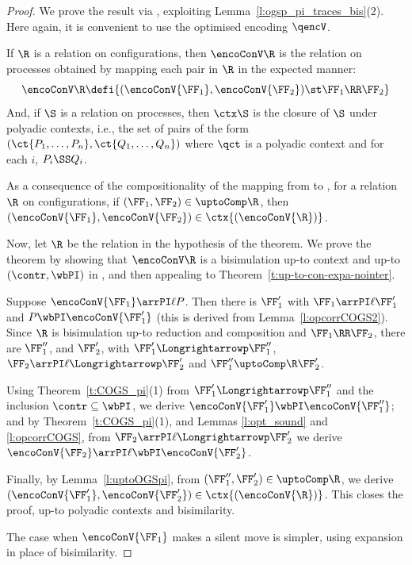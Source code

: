 \begin{proof}
We prove the result via \piI, exploiting Lemma~\ref{l:ogsp_pi_traces_bis}(2).
Here again, it is convenient to use
the optimised encoding $\qencV$.

If $\R$ is a relation on \COGS configurations, then 
$\encoConV \R$ is the relation on \piI processes obtained by mapping each pair
in $\R$ in the expected manner: 
\[ \encoConV \R \defi \{ (\encoConV {\FF_1}, \encoConV {\FF_2}) \st \FF_1 \RR \FF_2 
 \} \] 
And, if $\S$ is a relation on \piI processes, then $\ctx \S$ is the closure of $\S$ under
polyadic contexts, i.e., the set of pairs  of the form  
$(\ct {P_1,\ldots, P_n},\ct {Q_1,\ldots, Q_n})$ where $\qct$ is a polyadic context and for
each $i$, $P_i \SS Q_i$. 

As a consequence of the compositionality of the mapping from
\COGS to \piI,
for  a relation   $\R$ on \COGS configurations, 
if ${(\FF_1, \FF_2)} \in  { \uptoComp \R}$, then 
$( \encoConV {\FF_1},  \encoConV {\FF_2}) \in  \ctx{( \encoConV{ \R })}$. 




Now, let $\R$ be the relation in the hypothesis of the theorem.
We  prove the theorem by  showing that 
$\encoConV \R$ is a bisimulation
 up-to context and up-to $(\contr,
 \wbPI)$ in 
\piI, and then appealing to Theorem~\ref{t:up-to-con-expa-nointer}.  

Suppose 
$\encoConV {\FF_1}  \arrPI \ell P$.  Then
there is $\FF_1'$ with  
$\FF_1  \arrPI \ell \FF_1' $ and $P  \wbPI \encoConV {\FF'_1}$ (this is derived from
Lemma~\ref{l:opcorrCOGS2}).  
Since $\R$ is bisimulation up-to
 reduction and  composition and $\FF_1 \RR \FF_2$, there are 
  $\FF_1''$, and $\FF_2'$, with  
$\FF'_1 \Longrightarrowp \FF''_1$, 
$\FF_2
  \arrPI \ell \Longrightarrowp \FF_2' $ and
$\FF''_1 \uptoComp \R \FF'_2$. 


Using  Theorem~\ref{t:COGS_pi}(1) 
from 
$\FF'_1 \Longrightarrowp \FF''_1$ and the inclusion ${\contr} \subseteq
{\wbPI}$, 
we derive
$\encoConV {\FF'_1}  \wbPI  \encoConV {\FF''_1}$; 
and  by   
Theorem~\ref{t:COGS_pi}(1),
and  Lemmas \ref{l:opt_sound} and \ref{l:opcorrCOGS},  from 
$\FF_2
  \arrPI \ell \Longrightarrowp \FF_2' $ 
we derive
$\encoConV {\FF_2}  \arrPI \ell \wbPI  \encoConV {\FF'_2}$.   


Finally,  
\iflong
by Lemma~\ref{l:uptoOGSpi},  
\fi
from $(\FF''_1, \FF'_2) \in  \uptoComp \R$, we derive 
 $( \encoConV {\FF'_1},  \encoConV {\FF'_2}) \in  \ctx{( \encoConV{ \R })}$. 
This closes the proof, up-to polyadic contexts and bisimilarity.

The case when 
$\encoConV {\FF_1}$ makes a silent move is simpler,  
using expansion in place of bisimilarity.
\end{proof} 

